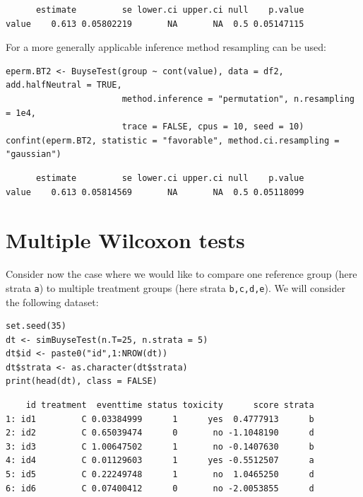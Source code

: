 \documentclass[12pt]{article}
\begin{document}
\begin{verbatim}
      estimate         se lower.ci upper.ci null    p.value
value    0.613 0.05802219       NA       NA  0.5 0.05147115
\end{verbatim}


For a more generally applicable inference method resampling can be used:
\lstset{language=r,label= ,caption= ,captionpos=b,numbers=none}
\begin{lstlisting}
eperm.BT2 <- BuyseTest(group ~ cont(value), data = df2, add.halfNeutral = TRUE,
                       method.inference = "permutation", n.resampling = 1e4,
                       trace = FALSE, cpus = 10, seed = 10)
confint(eperm.BT2, statistic = "favorable", method.ci.resampling = "gaussian")
\end{lstlisting}

\begin{verbatim}
      estimate         se lower.ci upper.ci null    p.value
value    0.613 0.05814569       NA       NA  0.5 0.05118099
\end{verbatim}


\clearpage

\section{Multiple Wilcoxon tests}
\label{sec:orgef4cd29}

Consider now the case where we would like to compare one reference
group (here strata \texttt{a}) to multiple treatment groups (here strata
\texttt{b,c,d,e}). We will consider the following dataset:
\lstset{language=r,label= ,caption= ,captionpos=b,numbers=none}
\begin{lstlisting}
set.seed(35)
dt <- simBuyseTest(n.T=25, n.strata = 5)
dt$id <- paste0("id",1:NROW(dt))
dt$strata <- as.character(dt$strata) 
print(head(dt), class = FALSE)
\end{lstlisting}

\begin{verbatim}
    id treatment  eventtime status toxicity      score strata
1: id1         C 0.03384999      1      yes  0.4777913      b
2: id2         C 0.65039474      0       no -1.1048190      d
3: id3         C 1.00647502      1       no -0.1407630      b
4: id4         C 0.01129603      1      yes -0.5512507      a
5: id5         C 0.22249748      1       no  1.0465250      d
6: id6         C 0.07400412      0       no -2.0053855      d
\end{verbatim}
\end{document}
